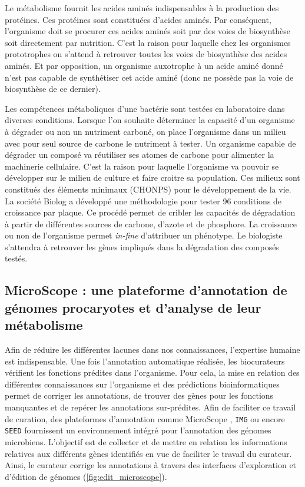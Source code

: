 \begin{refsegment}
    Le métabolisme fournit les acides aminés indispensables à la production des protéines. Ces protéines sont constituées d’acides aminés. Par conséquent, l’organisme doit se procurer ces acides aminés soit par des voies de biosynthèse soit directement par nutrition. C’est la raison pour laquelle chez les organismes prototrophes on s’attend à retrouver toutes les voies de biosynthèse des acides aminés. Et par opposition, un organisme auxotrophe à un acide aminé donné n’est pas capable de synthétiser cet acide aminé (donc ne possède pas  la voie de biosynthèse de ce dernier).
    
    Les compétences métaboliques d'une bactérie sont testées en laboratoire dans diverses conditions. Lorsque l'on souhaite déterminer la capacité d'un organisme à dégrader ou non un nutriment carboné, on place l'organisme dans un milieu avec pour seul source de carbone le nutriment à tester. Un organisme capable de dégrader un composé va réutiliser ses atomes de carbone pour alimenter la machinerie cellulaire. C'est la raison pour laquelle l'organisme va pouvoir se développer sur le milieu de culture et faire croitre sa population. Ces milieux sont constitués des éléments minimaux (\gls{CHONPS}) pour le développement de la vie. La société Biolog \cite{bochner2009global} a développé une méthodologie pour tester 96 conditions de croissance par plaque. Ce procédé permet de cribler les capacités de dégradation à partir de différentes sources de carbone, d'azote et de phosphore. La croissance ou non de l'organisme permet \textit{in-fine} d'attribuer un phénotype. Le biologiste s'attendra à retrouver les gènes impliqués dans la dégradation des composés testés.
    
    \subsection{MicroScope : une plateforme d’annotation de génomes procaryotes et d’analyse de leur métabolisme}
    
    Afin de réduire les différentes lacunes dans nos connaissances, l'expertise humaine est indispensable. Une fois l'annotation automatique réalisée, les biocurateurs vérifient les fonctions prédites dans l'organisme. Pour cela, la mise en relation des différentes connaissances sur l'organisme et des prédictions bioinformatiques permet de corriger les annotations, de trouver des gènes pour les fonctions manquantes et de repérer les annotations sur-prédites. Afin de faciliter ce travail de curation, des plateformes d'annotation comme MicroScope \cite{vallenet2016microscope,Belda2017}, \texttt{\gls{IMG}} \cite{markowitz2009img,markowitz2012img} ou encore \texttt{SEED} \cite{overbeek2004seed,overbeek2014seed} fournissent un environnement intégré pour l'annotation des génomes microbiens. L'objectif est de collecter et de mettre en relation les informations relatives aux différents gènes identifiés en vue de faciliter le travail du curateur. Ainsi, le curateur corrige les annotations à travers des interfaces d'exploration et d'édition de génomes (\cref{fig:edit_microscope}).
    

\end{refsegment}
